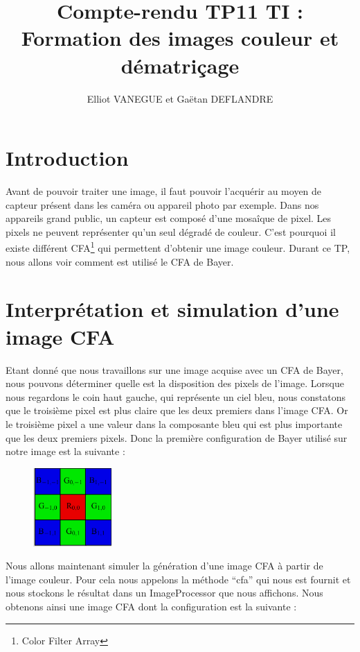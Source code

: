 \documentclass[a4paper,11pt]{article}
\title{Compte-rendu TP11 TI : Formation des images couleur et dématriçage}
\author{Elliot VANEGUE et Gaëtan DEFLANDRE}
\begin{document}


  \maketitle
  
  \mbox{}
  \newpage
  \clearpage
  
  \section{Introduction}
  Avant de pouvoir traiter une image, il faut pouvoir l'acquérir au moyen de capteur présent dans les
  caméra ou appareil photo par exemple. Dans nos appareils grand public, un capteur est composé d'une mosaîque
  de pixel. Les pixels ne peuvent représenter qu'un seul dégradé de couleur. C'est pourquoi il existe différent
  CFA\footnote{Color Filter Array} qui permettent d'obtenir une image couleur. Durant ce TP, nous allons voir
  comment est utilisé le CFA de Bayer.
  
  \section{Interprétation et simulation d'une image CFA}
  Etant donné que nous travaillons sur une image acquise avec un CFA de Bayer, nous pouvons déterminer quelle est
  la disposition des pixels de l'image. Lorsque nous regardons le coin haut gauche, qui représente un ciel bleu, nous
  constatons que le troisième pixel est plus claire que les deux premiers dans l'image CFA. Or le troisième pixel 
  a une valeur dans la composante bleu qui est plus importante que les deux premiers pixels. Donc la première configuration
  de Bayer utilisé sur notre image est la suivante : \\
  
  \begin{figure}[H]
  \center
   \includegraphics[width=3cm]{bayerGRG.png}
  \end{figure}

  Nous allons maintenant simuler la génération d'une image CFA à partir de l'image couleur. Pour
  cela nous appelons la méthode \enquote{cfa} qui nous est fournit et nous stockons le résultat
  dans un ImageProcessor que nous affichons. Nous obtenons ainsi une image CFA dont la configuration
  est la suivante :
  
\end{document}
